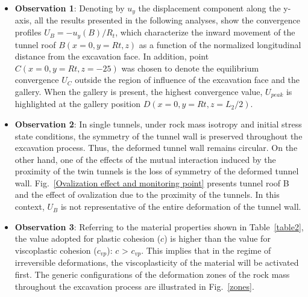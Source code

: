 \documentclass[a4paper,fleqn]{cas-sc}
\begin{document}
\begin{itemize}[]
	\item \textbf{Observation 1}: Denoting by $u_y$ the displacement component along the y-axis, all the results presented in the following analyses, show the convergence profiles $U_B = -u_y(B)/R_t$, which characterize the inward movement of the tunnel roof $B(x = 0, y = Rt, z)$ as a function of the normalized longitudinal distance from the excavation face. In addition, point $C(x=0, y =Rt, z = -25)$ was chosen to denote the equilibrium convergence $U_C$ outside the region of influence of the excavation face and the gallery. When the gallery is present, the highest convergence value, $U_{peak}$ is highlighted at the gallery position $D(x=0, y = Rt, z = L_2/2)$. 
 
	\item \textbf{Observation 2}: In single tunnels, under rock mass isotropy and initial stress state conditions, the symmetry of the tunnel wall is preserved throughout the excavation process. Thus, the deformed tunnel wall remains circular. On the other hand, one of the effects of the mutual interaction induced by the proximity of the twin tunnels is the loss of symmetry of the deformed tunnel wall. Fig.~\ref{Ovalization effect and monitoring point} presents tunnel roof B and the effect of ovalization due to the proximity of the tunnels. In this context, $U_B$ is not representative of the entire deformation of the tunnel wall.
	
	\item \textbf{Observation 3}: Referring to the material properties shown in Table~\ref{table2}, the value adopted for plastic cohesion ($c$) is higher than the value for viscoplastic cohesion ($c_{vp}$): $c$ > $c_{vp}$. This implies that in the regime of irreversible deformations, the viscoplasticity of the material will be activated first. The generic configurations of the deformation zones of the rock mass throughout the excavation process are illustrated in Fig.~\ref{zones}.
\end{itemize}
\end{document}
